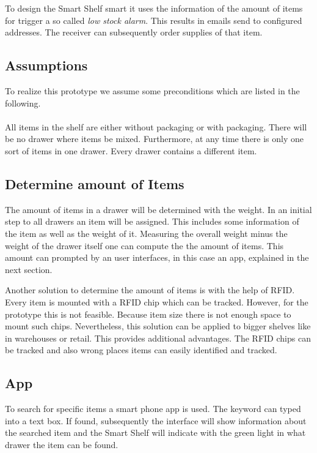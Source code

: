 \documentclass{sigchi}
\begin{document}
To design the Smart Shelf \glqq{}smart\grqq{} it uses the information of the amount of items for trigger a so called \textit{low stock alarm}. 
This results in emails send to configured addresses. 
The receiver can subsequently order supplies of that item. 


\subsection{Assumptions}
To realize this prototype we assume some preconditions which are listed in the following.
\\
\\
All items in the shelf are either without packaging or with packaging. 
There will be no drawer where items be mixed. 
Furthermore, at any time there is only one sort of items in one drawer. 
Every drawer contains a different item. 


\subsection{Determine amount of Items}
The amount of items in a drawer will be determined with the weight. 
In an initial step to all drawers an item will be assigned. 
This includes some information of the item as well as the weight of it. 
Measuring the overall weight minus the weight of the drawer itself one can compute the the amount of items. 
This amount can prompted by an user interfaces, in this case an app, explained in the next section. 

Another solution to determine the amount of items is with the help of RFID. 
Every item is mounted with a RFID chip which can be tracked. 
However, for the prototype this is not feasible. 
Because item size there is not enough space to mount such chips. 
Nevertheless, this solution can be applied to bigger shelves like in warehouses or retail. 
This provides additional advantages. 
The RFID chips can be tracked and also wrong places items can easily identified and tracked. 


\subsection{App}
To search for specific items a smart phone app is used. 
The keyword can typed into a text box. 
If found, subsequently the interface will show information about the searched item and the Smart Shelf will indicate with the green light in what drawer the item can be found. 
\end{document}
